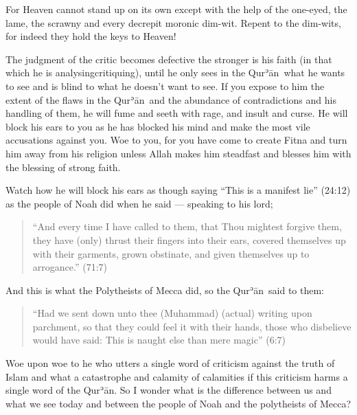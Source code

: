 \documentclass[12pt]{memoir}
\def\´{ʾ} %
\def \Quran{Qur\-\´ān} %
\def\/{\discretionary{/}{}{/}}
\newcommand{\QRef}[1]{{\color{darkblue}#1}}
\begin{document}
For Heaven cannot stand up on its own except with the help of the one-eyed,
the lame, the scrawny and every decrepit moronic dim-wit.
Repent to the dim-wits, for indeed they hold the keys to Heaven!

The judgment of the critic becomes defective the stronger is his faith
(in that which he is analysing\/critiquing),
until he only sees in the \Quran\ what he wants to see
and is blind to what he doesn’t want to see.
If you expose to him the extent of the flaws in the \Quran\
and the abundance of contradictions and his handling of them,
he will fume and seeth with rage, and insult and curse.
He will block his ears to you as he has blocked his mind
and make the most vile accusations against you.
Woe to you, for you have come to create Fitna
and turn him away from his religion unless Allah makes him
steadfast and blesses him with the blessing of strong faith.

Watch how he will block his ears as though saying “This is a manifest lie”
(\QRef{24:12}) as the people of Noah did when he said — speaking to his lord;

\begin{quote}
“And every time I have called to them, that Thou mightest forgive them,
they have (only) thrust their fingers into their ears,
covered themselves up with their garments, grown obstinate,
and given themselves up to arrogance.” (\QRef{71:7})
\end{quote}

And this is what the Polytheists of Mecca did, so the \Quran\ said to them:

\begin{quote}
“Had we sent down unto thee (Muhammad) (actual) writing upon parchment,
so that they could feel it with their hands,
those who disbelieve would have said:
This is naught else than mere magic” (\QRef{6:7})
\end{quote}

Woe upon woe to he who utters a single word of criticism against
the truth of Islam and what a catastrophe and calamity of calamities
if this criticism harms a single word of the \Quran.
So I wonder what is the difference between us and what we see today
and between the people of Noah and the polytheists of Mecca?\footnotemark
\end{document}
